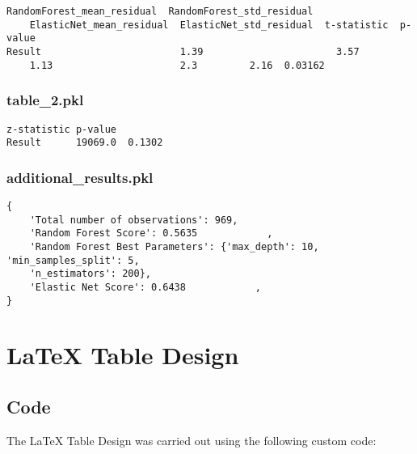 \documentclass[11pt]{article}
\begin{document}
\begin{Verbatim}[tabsize=4]
        RandomForest_mean_residual  RandomForest_std_residual
	ElasticNet_mean_residual  ElasticNet_std_residual  t-statistic  p-value
Result                        1.39                       3.57
	1.13                      2.3         2.16  0.03162
\end{Verbatim}

\subsubsection*{table\_2.pkl}

\begin{Verbatim}[tabsize=4]
        z-statistic p-value
Result      19069.0  0.1302
\end{Verbatim}

\subsubsection*{additional\_results.pkl}

\begin{Verbatim}[tabsize=4]
{
    'Total number of observations': 969,
    'Random Forest Score': 0.5635            ,
    'Random Forest Best Parameters': {'max_depth': 10, 'min_samples_split': 5,
	'n_estimators': 200},
    'Elastic Net Score': 0.6438            ,
}
\end{Verbatim}

\section{LaTeX Table Design}
\subsection{{Code}}
The LaTeX Table Design was carried out using the following custom code:
\end{document}

